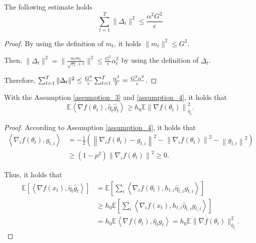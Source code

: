 \medskip

\begin{lemma}\label{lem1-004}
The following estimate holds
\[
\sum_{t=1}^T\|\Delta_t\|^2 \leq \frac{\alpha^2 G^2}{\epsilon}
\]
\end{lemma}

\begin{proof}
By using the definition of $m_{t}$, it holds $\|m_t\|^2\leq G^2$. 

Then,  $\|\Delta_t\|^2 = \|\frac{\alpha_tm_t}{\sqrt{v_t}+\epsilon}\|^2\leq \frac{G^2}{\epsilon}\alpha_t^2$ by using the definition of $ \Delta_{t}$. 

Therefore, $\small \sum_{t=1}^T\|\Delta_t\|^2 \leq \frac{G^2}{\epsilon}\sum_{t=1}^T\frac{\alpha^2}{T} = \frac{G^2\alpha^2}{\epsilon}$.

\end{proof}

\medskip


\begin{lemma}\label{lem1-005}
With the Assumption \ref{assumption_3} and \ref{assumption_4}, it holds that
\[
\mathbb{E} \left\langle \nabla f\left(\theta_t\right), \hat{\eta}_t\hat{g}_t \right\rangle \geq h_0\mathbb{E}  \left\|\nabla f\left(\theta_t\right)\right\|_{\hat{\eta}_t}^2. 
\]
\end{lemma}
\begin{proof}
    According to Assumption \ref{assumption_4}, it holds that
    \[
    \begin{split}
    \left\langle \nabla_i f\left(\theta_t\right), g_{t,i}\right\rangle &= -\frac{1}{2} \left(\left\|\nabla_i f\left(\theta_t\right) - g_{t,i}\right\|^2 - \left\|\nabla_i f\left(\theta_t\right)\right\|^2 - \left\|g_{t,i}\right\|^2\right)\\
    &\geq (1-p^2) \left\|\nabla_i f\left(\theta_t\right)\right\|^2 \geq 0.    
    \end{split}
    \]

    Thus, it holds that
    \[
    \begin{split}
    \mathbb{E} \left[\left\langle \nabla f(x_t), \hat{\eta}_t \hat{g}_t \right\rangle \right]&= \mathbb{E} \left[\sum_i \left\langle \nabla_i f(\theta_t), h_{t,i} \hat{\eta}_{t,i}g_{t,i} \right\rangle\right]\\
    &\geq  h_0 \mathbb{E}\left[ \sum_i \left\langle \nabla_i f(x_t), h_{t,i} \hat{\eta}_{t,i}g_{t,i} \right\rangle\right]\\
    &= h_0 \mathbb{E} \left\langle \nabla f(\theta_t), \hat{\eta}_t g_t \right\rangle = h_0 \mathbb{E} \|\nabla f(\theta_t)\|^2_{\hat{\eta}_t}.
    \end{split}
    \]
\end{proof}

